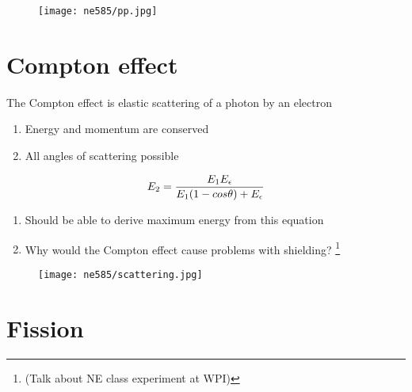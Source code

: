 \documentclass[aspectratio=1610,pdftex,dvipsnames,compress,xcolor={dvipsnames}]{beamer}
\begin{document}
\begin{frame}{}
    \begin{figure}
        \centering
        \texttt{[image: ne585/pp.jpg]}
    \end{figure}
\end{frame}


\section{Compton effect}


\addtocounter{framenumber}{-1} 
\begin{frame}{The Compton effect is elastic scattering of a photon by an electron}
    \begin{enumerate}[series=outerlist,topsep=0pt,itemsep=21pt,leftmargin=*,label=(\arabic*)]
        \item[]Energy and momentum are conserved
        \item[]All angles of scattering possible
    \end{enumerate}

    \begin{equation}
        \LARGE
        E_2 = \frac{E_1 E_{\epsilon}}{E_1 (1 - cos \theta) + E_{\epsilon}}
    \end{equation}

    \vspace*{\fill}

    \begin{enumerate}[series=outerlist,topsep=0pt,itemsep=21pt,leftmargin=*,label=(\arabic*)]
        \item[]Should be able to derive maximum energy from this equation
        \item[]Why would the Compton effect cause problems with shielding?
            \footnote[frame]{\tiny(Talk about NE class experiment at WPI)}
    \end{enumerate}
\end{frame}


\begin{frame}{}
    \begin{figure}
        \centering
        \texttt{[image: ne585/scattering.jpg]}
    \end{figure}
\end{frame}


\section{Fission}
\end{document}
